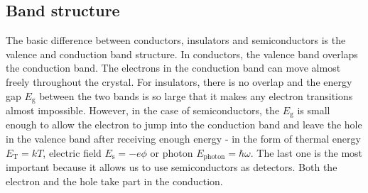  
 


\subsection{Band structure}
The basic difference between conductors, insulators and semiconductors is the valence and conduction band structure. In conductors, the valence band overlaps the conduction band. The electrons in the conduction band can move almost freely throughout the crystal. For insulators, there is no overlap and the energy gap $E_{\textrm{g}}$ between the two bands is so large that it makes any electron transitions almost impossible. However, in the case of semiconductors, the $E_{\textrm{g}}$ is small enough to allow the electron to jump into the conduction band and leave the hole in the valence band after receiving enough energy - in the form of thermal energy $E_{\textrm{T}} = kT$, electric field $E_{\textrm{s}} = -e\phi$ or photon $E_{\textrm{photon}} = \hbar \omega$. The last one is the most important because it allows us to use semiconductors as detectors. Both the electron and the hole take part in the conduction.


